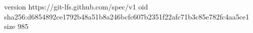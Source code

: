 version https://git-lfs.github.com/spec/v1
oid sha256:d6854892ce1792b48a51b8a246bcfc607b2351f22afc71b3c85e782fc4aa5ce1
size 985

